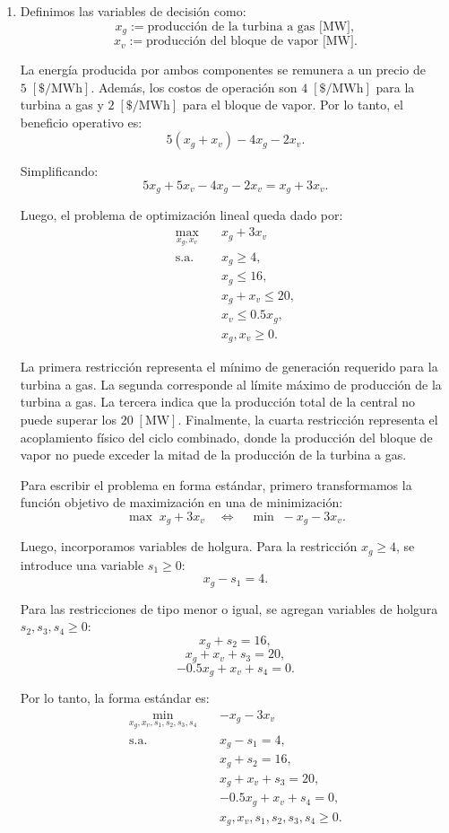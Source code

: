 \begin{enumerate}[label=\alph*)]

\item
Definimos las variables de decisión como:
\[
x_g := \text{producción de la turbina a gas [MW]},
\]
\[
x_v := \text{producción del bloque de vapor [MW]}.
\]

La energía producida por ambos componentes se remunera a un precio de
\(5\;[\$/\mathrm{MWh}]\). Además, los costos de operación son
\(4\;[\$/\mathrm{MWh}]\) para la turbina a gas y \(2\;[\$/\mathrm{MWh}]\)
para el bloque de vapor. Por lo tanto, el beneficio operativo es:
\[
5(x_g+x_v)-4x_g-2x_v.
\]

Simplificando:
\[
5x_g+5x_v-4x_g-2x_v
=
x_g+3x_v.
\]

Luego, el problema de optimización lineal queda dado por:
\[
\begin{aligned}
\max_{x_g,x_v} \quad & x_g+3x_v \\
\text{s.a.} \quad
& x_g \geq 4, \\
& x_g \leq 16, \\
& x_g+x_v \leq 20, \\
& x_v \leq 0.5x_g, \\
& x_g,x_v \geq 0.
\end{aligned}
\]

La primera restricción representa el mínimo de generación requerido para la
turbina a gas. La segunda corresponde al límite máximo de producción de la
turbina a gas. La tercera indica que la producción total de la central no puede
superar los \(20\;[\mathrm{MW}]\). Finalmente, la cuarta restricción representa
el acoplamiento físico del ciclo combinado, donde la producción del bloque de
vapor no puede exceder la mitad de la producción de la turbina a gas.

Para escribir el problema en forma estándar, primero transformamos la función
objetivo de maximización en una de minimización:
\[
\max \; x_g+3x_v
\quad \Longleftrightarrow \quad
\min \; -x_g-3x_v.
\]

Luego, incorporamos variables de holgura. Para la restricción
\(x_g \geq 4\), se introduce una variable \(s_1 \geq 0\):
\[
x_g - s_1 = 4.
\]

Para las restricciones de tipo menor o igual, se agregan variables de holgura
\(s_2,s_3,s_4 \geq 0\):
\[
x_g+s_2=16,
\]
\[
x_g+x_v+s_3=20,
\]
\[
-0.5x_g+x_v+s_4=0.
\]

Por lo tanto, la forma estándar es:
\[
\begin{aligned}
\min_{x_g,x_v,s_1,s_2,s_3,s_4} \quad
& -x_g-3x_v \\
\text{s.a.} \quad
& x_g-s_1 = 4, \\
& x_g+s_2 = 16, \\
& x_g+x_v+s_3 = 20, \\
& -0.5x_g+x_v+s_4 = 0, \\
& x_g,x_v,s_1,s_2,s_3,s_4 \geq 0.
\end{aligned}
\]


\end{enumerate}

